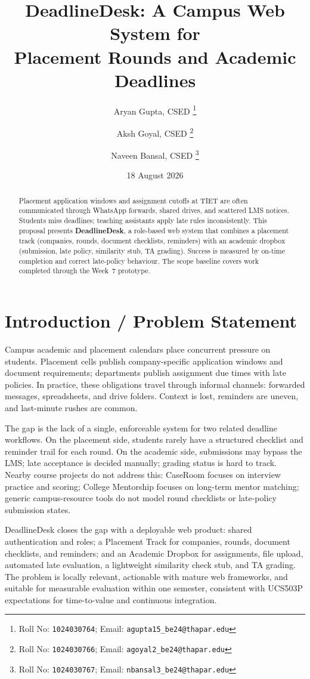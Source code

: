 \documentclass[11pt,a4paper]{article}
\title{DeadlineDesk: A Campus Web System for\\
Placement Rounds and Academic Deadlines}
\author{
  Aryan Gupta, CSED%
  \thanks{Roll No: \texttt{1024030764}; Email: \texttt{agupta15\_be24@thapar.edu}}
  \and
  Aksh Goyal, CSED%
  \thanks{Roll No: \texttt{1024030766}; Email: \texttt{agoyal2\_be24@thapar.edu}}
  \and
  Naveen Bansal, CSED%
  \thanks{Roll No: \texttt{1024030767}; Email: \texttt{nbansal3\_be24@thapar.edu}}
}
\date{18 August 2026}
\begin{document}
\maketitle

\begin{abstract}
\noindent
Placement application windows and assignment cutoffs at TIET are often
communicated through WhatsApp forwards, shared drives, and scattered LMS
notices. Students miss deadlines; teaching assistants apply late rules
inconsistently. This proposal presents \textbf{DeadlineDesk}, a role-based
web system that combines a placement track (companies, rounds, document
checklists, reminders) with an academic dropbox (submission, late policy,
similarity stub, TA grading). Success is measured by on-time completion and
correct late-policy behaviour. The scope baseline covers work completed
through the Week~7 prototype.
\end{abstract}

\section{Introduction / Problem Statement}

Campus academic and placement calendars place concurrent pressure on students.
Placement cells publish company-specific application windows and document
requirements; departments publish assignment due times with late policies.
In practice, these obligations travel through informal channels: forwarded
messages, spreadsheets, and drive folders. Context is lost, reminders are
uneven, and last-minute rushes are common.

The gap is the lack of a single, enforceable system for two related deadline
workflows. On the placement side, students rarely have a structured checklist
and reminder trail for each round. On the academic side, submissions may bypass
the LMS; late acceptance is decided manually; grading status is hard to track.
Nearby course projects do not address this: CaseRoom focuses on interview
practice and scoring; College Mentorship focuses on long-term mentor matching;
generic campus-resource tools do not model round checklists or late-policy
submission states.

DeadlineDesk closes the gap with a deployable web product: shared
authentication and roles; a Placement Track for companies, rounds, document
checklists, and reminders; and an Academic Dropbox for assignments, file
upload, automated late evaluation, a lightweight similarity check stub, and
TA grading. The problem is locally relevant, actionable with mature web
frameworks, and suitable for measurable evaluation within one semester,
consistent with UCS503P expectations for time-to-value and continuous
integration.
\end{document}

